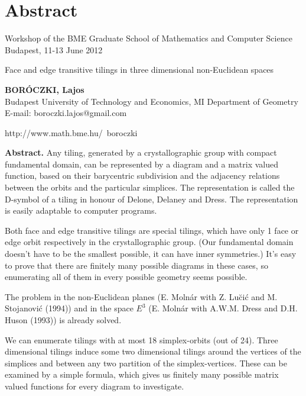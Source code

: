 \section{Abstract}
\begin{frame}
  \tiny
Workshop of the BME Graduate School of
Mathematics and Computer Science\\
Budapest, 11-13 June 2012
\vfill
\normalsize
\begin{center} 
  Face and edge transitive tilings in three dimensional non-Euclidean spaces
\end{center}

\vfill
\tiny
\textbf{BORÓCZKI, Lajos}\\
Budapest University of Technology and Economics, MI Department of Geometry\\
E-mail: boroczki.lajos@gmail.com\\
\vfill

http://www.math.bme.hu/~boroczki
\vfill

\tiny
\textbf{Abstract.}  Any tiling, generated by a crystallographic group with
compact fundamental domain, can be represented by a diagram and a matrix valued
function, based on their barycentric subdivision and the adjacency relations
between the orbits and the particular simplices. The representation is called
the D-symbol of a tiling in honour of Delone, Delaney and Dress. The
representation is easily adaptable to computer programs.
\vfill

Both face and edge transitive tilings are special tilings, which have only 1
face or edge orbit respectively in the crystallographic group. (Our fundamental
domain doesn't have to be the smallest possible, it can have inner symmetries.)
It's easy to prove that there are finitely many possible diagrams in these
cases, so enumerating all of them in every possible geometry seems possible.
\vfill

The problem in the non-Euclidean planes (E. Molnár with  Z.  Lu\u{c}i\'{c} and
M. Stojanovi\'{c} (1994)) and in the space $E^3$ (E. Molnár with A.W.M. Dress
and D.H. Huson (1993)) is already solved.
\vfill

We can enumerate tilings with at most 18 simplex-orbits (out of 24). Three
dimensional tilings induce some two dimensional tilings around the vertices of
the simplices and between any two partition of the simplex-vertices. These can
be examined by a simple formula, which gives us finitely many possible matrix
valued functions for every diagram to investigate.
\vfill


\end{frame}
